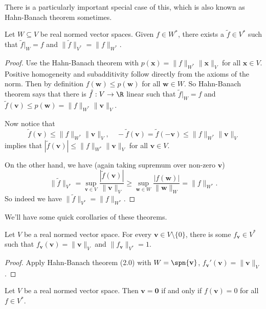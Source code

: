 \documentclass[a4paper]{article}
\begin{document}
There is a particularly important special case of this, which is also known as Hahn-Banach theorem sometimes.
\begin{cor}
  Let $W \subseteq V$ be real normed vector spaces. Given $f \in W^*$, there exists a $\tilde{f} \in V^*$ such that $\tilde{f}|_W = f$ and $\|\tilde{f}\|_{V^*} = \|f\|_{W^*}$.
\end{cor}

\begin{proof}
  Use the Hahn-Banach theorem with $p(\mathbf{x}) = \|f\|_{W^*}\|\mathbf{x}\|_V$ for all $\mathbf{x}\in V$. Positive homogeneity and subadditivity follow directly from the axioms of the norm. Then by definition $f(\mathbf{w}) \leq p(\mathbf{w})$ for all $\mathbf{w}\in W$. So Hahn-Banach theorem says that there is $\tilde{f}: V\to \R$ linear such that $\tilde{f}|_W = f$ and $\tilde{f}(\mathbf{v}) \leq p(\mathbf{w}) = \|f\|_{W^*} \|\mathbf{v}\|_V$.

  Now notice that
  \[
    \tilde{f}(\mathbf{v}) \leq \|f\|_{W^*}\|\mathbf{v}\|_V,\quad -\tilde{f}(\mathbf{v}) = \tilde{f}(-\mathbf{v}) \leq \|f\|_{W^*}\|\mathbf{v}\|_V
  \]
  implies that $|\tilde{f}(\mathbf{v})| \leq \|f\|_{W^*}\|\mathbf{v}\|_V$ for all $\mathbf{v}\in V$.

  On the other hand, we have (again taking supremum over non-zero $\mathbf{v}$)
  \[
    \|\tilde{f}\|_{V^*} = \sup_{\mathbf{v}\in V} \frac{|\tilde{f}(\mathbf{v})|}{\|\mathbf{v}\|_V} \geq \sup_{\mathbf{w}\in W} \frac{|f(\mathbf{w})|}{\|\mathbf{w}\|_W} = \|f\|_{W^*}.
  \]
  So indeed we have $\|\tilde{f}\|_{V^*} = \|f\|_{W^*}$.
\end{proof}

We'll have some quick corollaries of these theorems.
\begin{prop}
  Let $V$ be a real normed vector space. For every $\mathbf{v}\in V\setminus \{0\}$, there is some $f_{\mathbf{v}} \in V^*$ such that $f_{\mathbf{v}}(\mathbf{v}) = \|\mathbf{v}\|_V$ and $\|f_{\mathbf{v}}\|_{V^*} = 1$.
\end{prop}

\begin{proof}
  Apply Hahn-Banach theorem (2.0) with $W = \spn\{\mathbf{v}\}$, $f_{\mathbf{v}}'(\mathbf{v}) = \|\mathbf{v}\|_V$.
\end{proof}

\begin{cor}
  Let $V$ be a real normed vector space. Then $\mathbf{v} = \mathbf{0}$ if and only if $f(\mathbf{v}) = 0$ for all $f\in V^*$.
\end{cor}
\end{document}
